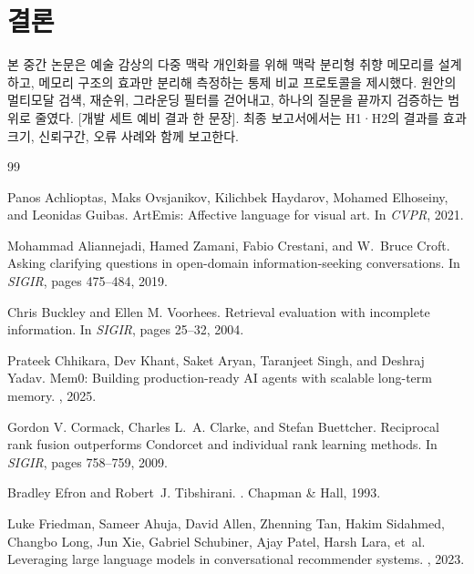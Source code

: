 \documentclass[10pt,twocolumn,letterpaper]{article}
\newcommand{\fillin}[1]{\textcolor{fillc}{[#1]}}
\begin{document}
\section{결론}
본 중간 논문은 예술 감상의 다중 맥락 개인화를 위해 맥락 분리형 취향 메모리를 설계하고, 메모리 구조의 효과만 분리해 측정하는 통제 비교 프로토콜을 제시했다. 원안의 멀티모달 검색, 재순위, 그라운딩 필터를 걷어내고, 하나의 질문을 끝까지 검증하는 범위로 줄였다. \fillin{개발 세트 예비 결과 한 문장}. 최종 보고서에서는 H1·H2의 결과를 효과크기, 신뢰구간, 오류 사례와 함께 보고한다.

\small
\renewcommand{\refname}{참고문헌}\begin{thebibliography}{99}\setlength{\itemsep}{1pt}

Panos Achlioptas, Maks Ovsjanikov, Kilichbek Haydarov, Mohamed Elhoseiny, and Leonidas Guibas.
\newblock ArtEmis: Affective language for visual art.
\newblock In {\em CVPR}, 2021.

Mohammad Aliannejadi, Hamed Zamani, Fabio Crestani, and W.~Bruce Croft.
\newblock Asking clarifying questions in open-domain information-seeking conversations.
\newblock In {\em SIGIR}, pages 475--484, 2019.

Chris Buckley and Ellen M. Voorhees.
\newblock Retrieval evaluation with incomplete information.
\newblock In {\em SIGIR}, pages 25--32, 2004.

Prateek Chhikara, Dev Khant, Saket Aryan, Taranjeet Singh, and Deshraj Yadav.
\newblock Mem0: Building production-ready AI agents with scalable long-term memory.
, 2025.

Gordon V. Cormack, Charles L.~A. Clarke, and Stefan Buettcher.
\newblock Reciprocal rank fusion outperforms Condorcet and individual rank learning methods.
\newblock In {\em SIGIR}, pages 758--759, 2009.

Bradley Efron and Robert~J. Tibshirani.
.
\newblock Chapman \& Hall, 1993.

Luke Friedman, Sameer Ahuja, David Allen, Zhenning Tan, Hakim Sidahmed, Changbo Long, Jun Xie, Gabriel Schubiner, Ajay Patel, Harsh Lara, et~al.
\newblock Leveraging large language models in conversational recommender systems.
, 2023.


\end{thebibliography}
\end{document}
